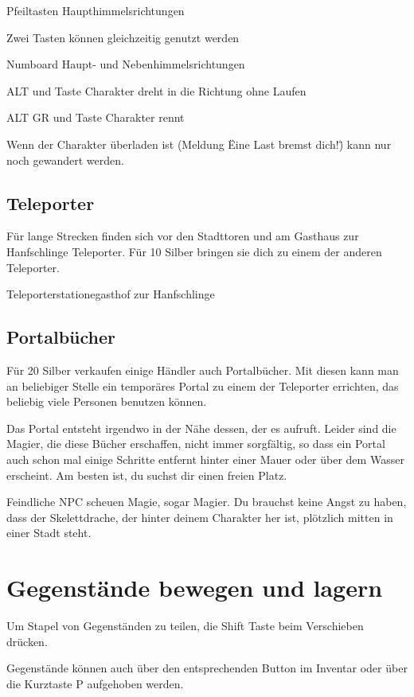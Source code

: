 \documentclass[a4paper,11pt]{book}
\begin{document}
Pfeiltasten  Haupthimmelsrichtungen

Zwei Tasten können gleichzeitig genutzt werden

Numboard  Haupt- und Nebenhimmelsrichtungen

ALT und Taste  Charakter dreht in die Richtung ohne Laufen

ALT GR und Taste  Charakter rennt

Wenn der Charakter überladen ist (Meldung \"Eine Last bremst dich!\") kann nur noch gewandert werden.

\subsection{Teleporter}

Für lange Strecken finden sich vor den Stadttoren und am Gasthaus zur Hanfschlinge Teleporter. Für 10 Silber bringen sie dich zu einem der anderen Teleporter.

Teleporterstationegasthof zur Hanfschlinge

\subsection{Portalbücher}

Für 20 Silber verkaufen einige Händler auch Portalbücher. Mit diesen kann man an beliebiger Stelle ein temporäres Portal zu einem der Teleporter errichten, das beliebig viele Personen benutzen können.

Das Portal entsteht irgendwo in der Nähe dessen, der es aufruft. Leider sind die Magier, die diese Bücher erschaffen, nicht immer sorgfältig, so dass ein Portal auch schon mal einige Schritte entfernt hinter einer Mauer oder über dem Wasser erscheint. Am besten ist, du suchst dir einen freien Platz.

Feindliche NPC scheuen Magie, sogar Magier. Du brauchst keine Angst zu haben, dass der Skelettdrache, der hinter deinem Charakter her ist, plötzlich mitten in einer Stadt steht.

\section{Gegenstände bewegen und lagern}

Um Stapel von Gegenständen zu teilen, die Shift Taste beim Verschieben drücken.

Gegenstände können auch über den entsprechenden Button im Inventar oder über die Kurztaste P aufgehoben werden.
\end{document}

